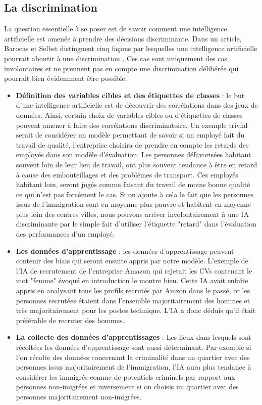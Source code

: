 \subsection{La discrimination}
La question essentielle à se poser est de savoir comment une intelligence artificielle est amenée à prendre des décisions discriminante. Dans un article, Barocas et Selbst distinguent cinq façons par lesquelles une intelligence artificielle pourrait aboutir à une discrimination \cite{discriminationWay}. Ces cas sont uniquement des cas involontaires et ne prennent pas en compte une discrimination délibérée qui pourrait bien évidemment être possible.
\begin{itemize}
    \item \textbf{Définition des variables cibles et des étiquettes de classes} : le but d'une intelligence artificielle est de découvrir des corrélations dans des jeux de données. Ainsi, certain choix de variables cibles ou d'étiquettes de classes peuvent amener à faire des corrélations discriminatoire. Un exemple trivial serait de considérer un modèle permettant de savoir si un employé fait du travail de qualité, l'entreprise choisira de prendre en compte les retards des employés dans son modèle d'évaluation. Les personnes défavorisées habitant souvent loin de leur lieu de travail, ont plus souvent tendance à être en retard à cause des embouteillages et des problèmes de transport. Ces employés habitant loin, seront jugés comme faisant du travail de moins bonne qualité ce qui n'est pas forcément le cas. Si on ajoute à cela le fait que les personnes issus de l'immigration sont en moyenne plus pauvre et habitent en moyenne plus loin des centres villes, nous pouvons arriver involontairement à une IA discriminante par le simple fait d'utiliser l'étiquette "retard" dans l'évaluation des performances d'un employé.
    \item \textbf{Les données d'apprentissage} : les données d'apprentissage peuvent contenir des biais qui seront ensuite appris par notre modèle. L'exemple de l'IA de recrutement de l'entreprise Amazon qui rejetait les CVs contenant le mot "femme"\cite{amazonAi} évoqué en introduction le montre bien. Cette IA avait enfaîte appris en analysant tous les profils recrutés par Amzon dans le passé, or les personnes recrutées étaient dans l'ensemble majoritairement des hommes et très majoritairement pour les postes technique. L'IA a donc déduis qu'il était préférable de recruter des hommes.
    \item \textbf{La collecte des données d'apprentissages} : Les lieux dans lesquels sont récoltées les données d'apprentissage sont aussi déterminant. Par exemple si l'on récolte des données concernant la criminalité dans un quartier avec des personnes issus majoritairement de l'immigration, l'IA aura plus tendance à considérer les immigrés comme de potentiels criminels par rapport aux personnes non-imigrées et inversement si on choisis un quartier avec des personnes majoritairement non-imigrées.

\end{itemize}
